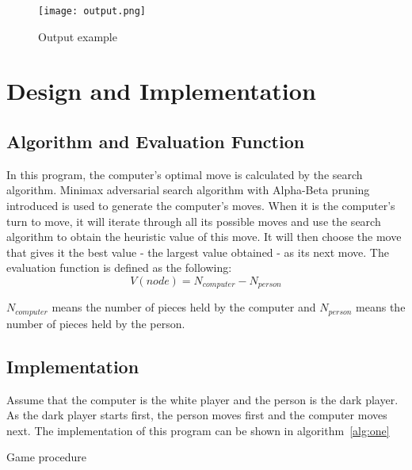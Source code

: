 \documentclass[a4paper, 11pt]{article}
\begin{document}
\begin{figure}[!htbp]
  \texttt{[image: output.png]}
  \caption{Output example}
  \label{fig:one}
\end{figure}

\section*{Design and Implementation}
\subsection{Algorithm and Evaluation Function}
In this program, the computer's optimal move is calculated by the search algorithm. Minimax adversarial search algorithm with Alpha-Beta pruning introduced is used to generate the computer's moves. When it is the computer's turn to move, it will iterate through all its possible moves and use the search algorithm to obtain the heuristic value of this move. It will then choose the move that gives it the best value - the largest value obtained - as its next move. The evaluation function is defined as the following:
\begin{equation}
\label{eqn:09}
V(node) = N_{computer} - N_{person}
\end{equation}

$N_{computer}$ means the number of pieces held by the computer and $N_{person}$ means the number of pieces held by the person.

\subsection{Implementation}
Assume that the computer is the white player and the person is the dark player. As the dark player starts first, the person moves first and the computer moves next. The implementation of this program can be shown in algorithm~\ref{alg:one}
\begin{algorithm}[!htbp]
\SetAlgoNoLine
{}
\caption{Game procedure}
\label{alg:one}
\end{algorithm}
\end{document}
